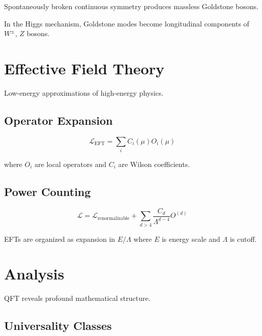 \begin{proposition}
\label{prop:goldstone}
Spontaneously broken continuous symmetry produces massless Goldstone bosons.
\end{proposition}

In the Higgs mechanism, Goldstone modes become longitudinal components of $W^\pm$, $Z$ bosons.

\section{Effective Field Theory}

Low-energy approximations of high-energy physics.

\subsection{Operator Expansion}

\begin{definition}
\label{def:eft}
\begin{equation}
\mathcal{L}_{\text{EFT}} = \sum_i C_i(\mu) O_i(\mu)
\end{equation}

where $O_i$ are local operators and $C_i$ are Wilson coefficients.
\end{definition}

\subsection{Power Counting}

\begin{equation}
\mathcal{L} = \mathcal{L}_{\text{renormalizable}} + \sum_{d>4} \frac{C_d}{\Lambda^{d-4}} O^{(d)}
\end{equation}

\begin{theorem}
\label{thm:weinberg}
EFTs are organized as expansion in $E/\Lambda$ where $E$ is energy scale and $\Lambda$ is cutoff.
\end{theorem}

\section{Analysis}

QFT reveals profound mathematical structure.

\subsection{Universality Classes}

